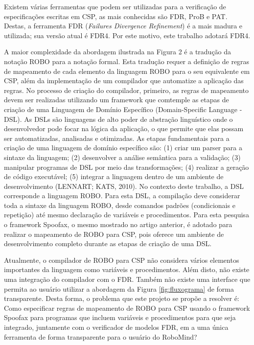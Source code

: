 Existem várias ferramentas que podem ser utilizadas para a verificação de especificações escritas em CSP, as mais conhecidas são FDR, ProB e PAT. Destas, a ferramenta FDR (\textit{Failures Divergence Refinement}) é a mais madura e utilizada; sua versão atual é FDR4. Por este motivo, este trabalho adotará FDR4.

A maior complexidade da abordagem ilustrada na Figura 2 é a tradução da notação ROBO para a notação formal. Esta tradução requer a definição de regras de mapeamento de cada elemento da linguagem ROBO para o seu equivalente em CSP, além da implementação de um compilador que automatize a aplicação das regras. No processo de criação do compilador, primeiro, as regras de mapeamento devem ser realizadas utilizando um framework que comtemple as etapas de criação de uma Linguagem de Domínio Específico (Domain-Specific Language - DSL). As DSLs são linguagens de alto poder de abstração linguístico onde o desenvolvedor pode focar na lógica da aplicação, o que permite que elas possam ser automatizadas, analisadas e otimizadas. As etapas fundamentais para a criação de uma linguagem de domínio específico são: (1) criar um parser para a sintaxe da linguagem; (2) desenvolver a análise semântica para a validação; (3) manipular programas de DSL por meio das transformações; (4) realizar a geração de código executável; (5) integrar a linguagem dentro de um ambiente de desenvolvimento (LENNART; KATS, 2010). No contexto deste trabalho, a DSL corresponde a linguagem ROBO. Para esta DSL, a compilação deve considerar toda a sintaxe da linguagem ROBO, desde comandos padrões (condicionais e repetição) até mesmo declaração de variáveis e procedimentos. Para esta pesquisa o framework Spoofax, o mesmo mostrado no artigo anterior, é adotado para realizar o mapeamento de ROBO para CSP, pois oferece um ambiente de desenvolvimento completo durante as etapas de criação de uma DSL.

Atualmente, o compilador de ROBO para CSP não considera vários elementos importantes da linguagem como variáveis e procedimentos. Além disto, não existe uma integração do compilador com o FDR. Também não existe uma interface que permita ao usuário utilizar a abordagem da Figura \ref{fig:fluxograma} de forma transparente. Desta forma, o problema que este projeto se propõe a resolver é:
Como especificar regras de mapeamento de ROBO para CSP usando o framework Spoofax para programas que incluem variáveis e procedimentos para que seja integrado, juntamente com o verificador de modelos FDR, em a uma única ferramenta de forma transparente para o usuário do RoboMind?

